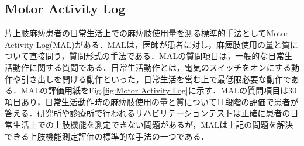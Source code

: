 \subsection*{Motor Activity Log}
片上肢麻痺患者の日常生活上での麻痺肢使用量を測る標準的手法としてMotor Activity Log(MAL)\cite{Taub2006,Uswatte2005,Uswatte2000,Winstein2003,Michielsen2012}がある．MALは，医師が患者に対し，麻痺肢使用の量と質について直接問う，質問形式の手法である．MALの質問項目は，一般的な日常生活動作に関する質問である．日常生活動作とは，電気のスイッチをオンにする動作や引き出しを開ける動作といった，日常生活を営む上で最低限必要な動作である．MALの評価用紙をFig.\ref{fig:Motor Activity Log}に示す．MALの質問項目は30項目あり，日常生活動作時の麻痺肢使用の量と質について11段階の評価で患者が答える．研究所や診療所で行われるリハビリテーションテストは正確に患者の日常生活上での上肢機能を測定できない問題があるが，MALは上記の問題を解決できる上肢機能測定評価の標準的な手法の一つである．

